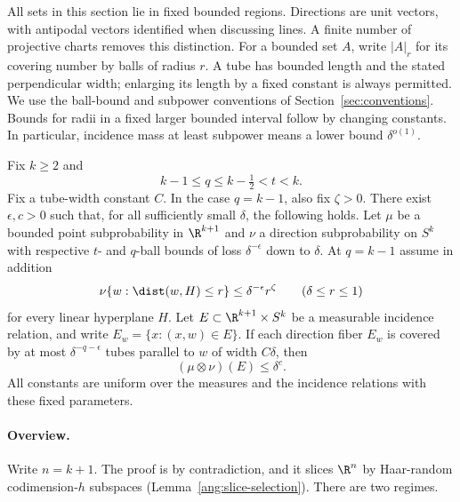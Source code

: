 
All sets in this section lie in fixed bounded regions. Directions are unit
vectors, with antipodal vectors identified when discussing lines. A finite
number of projective charts removes this distinction. For a bounded set
$A$, write $|A|_r$ for its covering number by balls of radius $r$. A tube has
bounded length and the stated perpendicular width; enlarging its length by
a fixed constant is always permitted. We use the ball-bound and subpower
conventions of Section~\ref{sec:conventions}. Bounds for radii in a fixed
larger bounded interval follow by changing constants. In particular,
incidence mass at least subpower means a lower bound $\delta^{o(1)}$.


\begin{theorem}\label{ang:linear-gain}
Fix $k\ge2$ and
\[
 k-1\le q\le k-\tfrac12<t<k.
\]
Fix a tube-width constant $C$. In the case $q=k-1$, also fix
$\zeta>0$. There exist $\epsilon,c>0$ such that, for all sufficiently
small $\delta$, the following holds. Let $\mu$ be a bounded point
subprobability in $\R^{k+1}$ and $\nu$ a direction subprobability on $S^k$
with respective $t$- and $q$-ball bounds of loss $\delta^{-\epsilon}$
down to $\delta$. At $q=k-1$ assume in addition
\begin{equation}\label{ang:endpoint-plate}
 \nu\{w:\dist(w,H)\le r\}\le\delta^{-\epsilon}r^\zeta
       \qquad(\delta\le r\le1)
\end{equation}
for every linear hyperplane $H$. Let $E\subset\R^{k+1}\times S^k$ be a
measurable incidence relation, and write $E_w=\{x:(x,w)\in E\}$.
If each direction fiber $E_w$ is covered by at most
$\delta^{-q-\epsilon}$ tubes parallel to $w$ of width $C\delta$, then
\[
 (\mu\otimes\nu)(E)\le\delta^c.
\]
All constants are uniform over the measures and the incidence relations
with these fixed parameters.
\end{theorem}

\paragraph{Overview.} Write $n=k+1$. The proof is by contradiction, and it slices $\R^{n}$ by Haar-random codimension-$h$ subspaces (Lemma~\ref{ang:slice-selection}). There are two regimes.


